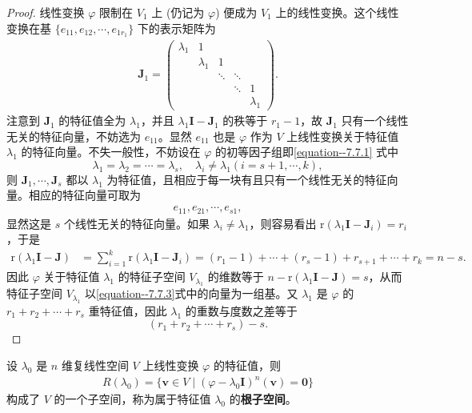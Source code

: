 \documentclass[../../main.tex]{subfiles}%
\begin{document}
\begin{proof}
线性变换 $\varphi$ 限制在 $V_1$ 上 (仍记为 $\varphi$) 便成为 $V_1$ 上的线性变换。这个线性变换在基 $\{e_{11}, e_{12}, \cdots, e_{1r_1}\}$ 下的表示矩阵为
\begin{align*}
\boldsymbol{J}_1 = 
\begin{pmatrix}
\lambda_1 & 1 & & & \\
& \lambda_1 & 1 & & \\
& & \ddots & \ddots & \\
& & & \ddots & 1 \\
& & & & \lambda_1
\end{pmatrix}.
\end{align*}
注意到 $\boldsymbol{J}_1$ 的特征值全为 $\lambda_1$，并且 $\lambda_1\boldsymbol{I} - \boldsymbol{J}_1$ 的秩等于 $r_1 - 1$，故 $\boldsymbol{J}_1$ 只有一个线性无关的特征向量，不妨选为 $e_{11}$。显然 $e_{11}$ 也是 $\varphi$ 作为 $V$ 上线性变换关于特征值 $\lambda_1$ 的特征向量。不失一般性，不妨设在 $\varphi$ 的初等因子组即\eqref{equation--7.7.1} 式中
\[
\lambda_1 = \lambda_2 = \cdots = \lambda_s, \quad \lambda_i \neq \lambda_1 (i = s + 1, \cdots, k),
\]
则 $\boldsymbol{J}_1, \cdots, \boldsymbol{J}_s$ 都以 $\lambda_1$ 为特征值，且{\heiti 相应于每一块有且只有一个线性无关的特征向量}。相应的特征向量可取为
\begin{align}
e_{11}, e_{21}, \cdots, e_{s1}, \label{equation--7.7.3}
\end{align}
显然这是 $s$ 个线性无关的特征向量。如果 $\lambda_i \neq \lambda_1$，则容易看出 $\mathrm{r}(\lambda_1\boldsymbol{I} - \boldsymbol{J}_i) = r_i$，于是
\begin{align*}
\mathrm{r}(\lambda_1\boldsymbol{I} - \boldsymbol{J}) &= \sum_{i = 1}^{k} \mathrm{r}(\lambda_1\boldsymbol{I} - \boldsymbol{J}_i) = (r_1 - 1) + \cdots + (r_s - 1) + r_{s + 1} + \cdots + r_k = n - s.
\end{align*}
因此 $\varphi$ 关于特征值 $\lambda_1$ 的特征子空间 $V_{\lambda_1}$ 的维数等于 $n - \mathrm{r}(\lambda_1\boldsymbol{I} - \boldsymbol{J}) = s$，从而特征子空间 $V_{\lambda_1}$ 以\eqref{equation--7.7.3}式中的向量为一组基。又 $\lambda_1$ 是 $\varphi$ 的 $r_1 + r_2 + \cdots + r_s$ 重特征值，因此 $\lambda_1$ 的重数与度数之差等于
\[
(r_1 + r_2 + \cdots + r_s) - s.
\]

\end{proof}

\begin{definition}[根子空间]
设 $\lambda_0$ 是 $n$ 维复线性空间 $V$ 上线性变换 $\varphi$ 的特征值，则
\begin{align*}
R(\lambda_0) = \{\boldsymbol{v} \in V \mid (\varphi - \lambda_0\boldsymbol{I})^n(\boldsymbol{v}) = \boldsymbol{0}\}
\end{align*}
构成了 $V$ 的一个子空间，称为属于特征值 $\lambda_0$ 的\textbf{根子空间}。 
\end{definition}
\end{document}
